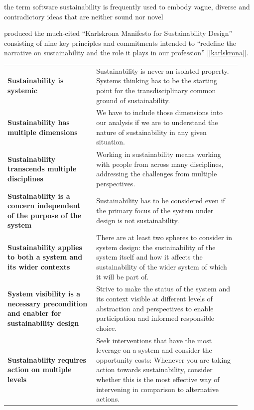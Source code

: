 \begin{displayquote}
the term software sustainability is frequently used to embody vague, diverse and contradictory ideas that are neither sound nor novel \citep[p. 5]{Venters2014}\end{displayquote}

\citet{Becker2015} produced the much-cited \enquote{Karlskrona Manifesto for Sustainability Design} consisting of nine key principles and commitments intended to \enquote{redefine the narrative on sustainability and the role it plays in our profession} [\autoref{karlskrona}].

\begin{table}[htbp]
    \centering
    \begin{tabular}{>{\raggedright}p{0.35\linewidth} | p{0.58\linewidth}}
        \hline
        \textbf{Sustainability is systemic} & Sustainability is never an isolated property. Systems thinking has to be the starting point for the transdisciplinary common ground of sustainability. \\
        \textbf{Sustainability has multiple dimensions} & We have to include those dimensions into our analysis if we are to understand the nature of sustainability in any given situation. \\
        \textbf{Sustainability transcends multiple disciplines} & Working in sustainability means working with people from across many disciplines, addressing the challenges from multiple perspectives. \\
        \textbf{Sustainability is a concern independent of the purpose of the system} & Sustainability has to be considered even if the primary focus of the system under design is not sustainability. \\
        \textbf{Sustainability applies to both a system and its wider contexts} & There are at least two spheres to consider in system design: the sustainability of the system itself and how it affects the sustainability of the wider system of which it will be part of. \\
        \textbf{System visibility is a necessary precondition and enabler for sustainability design} & Strive to make the status of the system and its context visible at different levels of abstraction and perspectives to enable participation and informed responsible choice. \\
        \textbf{Sustainability requires action on multiple levels} & Seek interventions that have the most leverage on a system and consider the opportunity costs: Whenever you are taking action towards sustainability, consider whether this is the most effective way of intervening in comparison to alternative actions. \\

\end{tabular}
\end{table}
